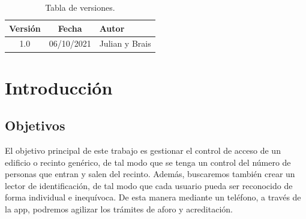 \documentclass[a4paper,openright,12pt]{article}
\begin{document}
\newpage



\tableofcontents

\vspace{3cm}

\begin{flushright}
\begin{table}[hbtp]
\begin{center}

\caption{Tabla de versiones.}
\label{tabla:versiones}
\small
\vspace{1ex}

\begin{tabular}{|c|c|l|}
\hline
Versión & Fecha & Autor \\
\hline \hline
1.0 & 06/10/2021 & Julian y Brais\\ \hline

\end{tabular}

\end{center}
\end{table}
\end{flushright}


\newpage
{}


\section{Introducción}\label{cap.introduccion}

\subsection{Objetivos}
El objetivo principal de este trabajo es gestionar el control de acceso de un edificio o recinto genérico, de tal modo que se tenga un control del número de personas que entran y salen del recinto. Además, buscaremos también crear un lector de identificación, de tal modo que cada usuario pueda ser reconocido de forma individual e inequívoca. De esta manera mediante un teléfono, a través de la app, podremos agilizar los trámites de aforo y acreditación.
\end{document}
